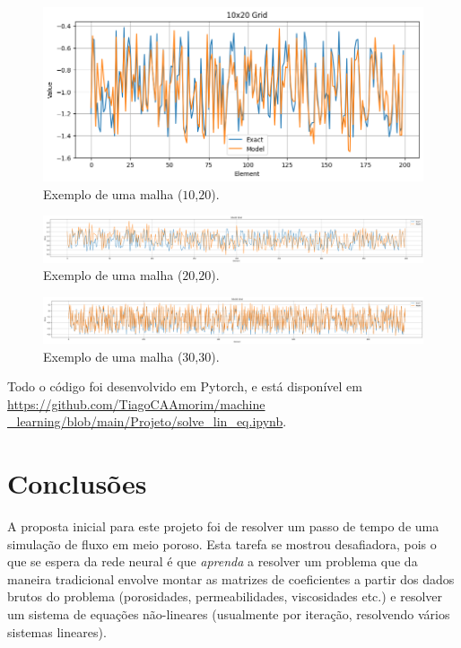 \documentclass[final,5p]{elsarticle}
\numberwithin{equation}{section}
\begin{document}
    \begin{figure}[hbt!]
        \centering
        \includegraphics[width=0.85\columnwidth]{./fig/10x20.png}
        \caption{Exemplo de uma malha ($10$,$20$).}\label{fig:10x20}
    \end{figure}

    \begin{figure}[hbt!]
        \centering
        \includegraphics[width=0.95\columnwidth]{./fig/20x20.png}
        \caption{Exemplo de uma malha ($20$,$20$).}\label{fig:20x20}
    \end{figure}

    \begin{figure}[hbt!]
        \centering
        \includegraphics[width=0.95\columnwidth]{./fig/30x30.png}
        \caption{Exemplo de uma malha ($30$,$30$).}\label{fig:30x30}
    \end{figure}


    Todo o código foi desenvolvido em Pytorch, e está disponível em \href{https://github.com/TiagoCAAmorim/machine\_learning/blob/main/Projeto/solve_lin_eq.ipynb}{https://github.com/TiagoCAAmorim/machine \_learning/blob/main/Projeto/solve\_lin\_eq.ipynb}.


\section{Conclusões}

    A proposta inicial para este projeto foi de resolver um passo de tempo de uma simulação de fluxo em meio poroso. Esta tarefa se mostrou desafiadora, pois o que se espera da rede neural é que \emph{aprenda} a resolver um problema que da maneira tradicional envolve montar as matrizes de coeficientes a partir dos dados brutos do problema (porosidades, permeabilidades, viscosidades etc.) e resolver um sistema de equações não-lineares (usualmente por iteração, resolvendo vários sistemas lineares).
\end{document}
